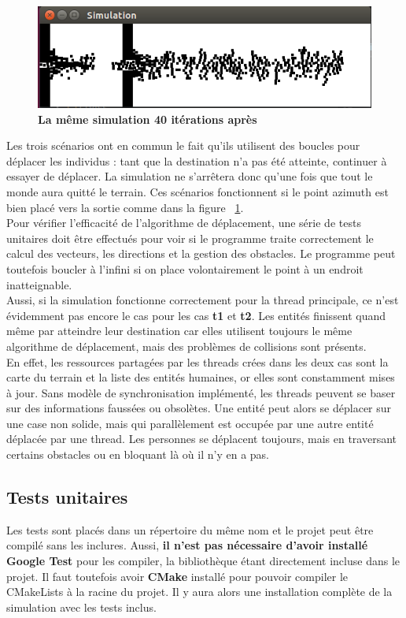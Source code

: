 \documentclass[11pt]{article} %
\begin{document}
\begin{figure}[h]
\caption{\label{f2} \textbf{La même simulation 40 itérations après}}
  \centering
\includegraphics[width=12cm]{graph2}
\end{figure}

Les trois scénarios ont en commun le fait qu'ils utilisent des boucles pour déplacer les individus : tant que la destination n'a pas été atteinte, continuer à essayer de déplacer. La simulation ne s'arrêtera donc qu'une fois que tout le monde aura quitté le terrain. Ces scénarios fonctionnent si le point azimuth est bien placé vers la sortie comme dans la figure ~\ref{f2}. \\
Pour vérifier l'efficacité de l'algorithme de déplacement, une série de tests unitaires doit être effectués pour voir si le programme traite correctement le calcul des vecteurs, les directions et la gestion des obstacles. 
Le programme peut toutefois boucler à l'infini si on place volontairement le point à un endroit inatteignable. \\
Aussi, si la simulation fonctionne correctement pour la thread principale, ce n'est évidemment pas encore le cas pour les cas \textbf{t1} et \textbf{t2}. Les entités finissent quand même par atteindre leur destination car elles utilisent toujours le même algorithme de déplacement, mais des problèmes de collisions sont présents. \\
En effet, les ressources partagées par les threads crées dans les deux cas sont la carte du terrain et la liste des entités humaines, or elles sont constamment mises à jour. Sans modèle de synchronisation implémenté, les threads peuvent se baser sur des informations faussées ou obsolètes. Une entité peut alors se déplacer sur une case non solide, mais qui parallèlement est occupée par une autre entité déplacée par une thread. Les personnes se déplacent toujours, mais en traversant certains obstacles ou en bloquant là où il n'y en a pas.

\subsection{Tests unitaires}
Les tests sont placés dans un répertoire du même nom et le projet peut être compilé sans les inclures. Aussi, \textbf{il n'est pas nécessaire d'avoir installé Google Test} pour les compiler, la bibliothèque étant directement incluse dans le projet. Il faut toutefois avoir \textbf{CMake} installé pour pouvoir compiler le CMakeLists à la racine du projet. Il y aura alors une installation complète de la simulation avec les tests inclus. \\
\end{document}
